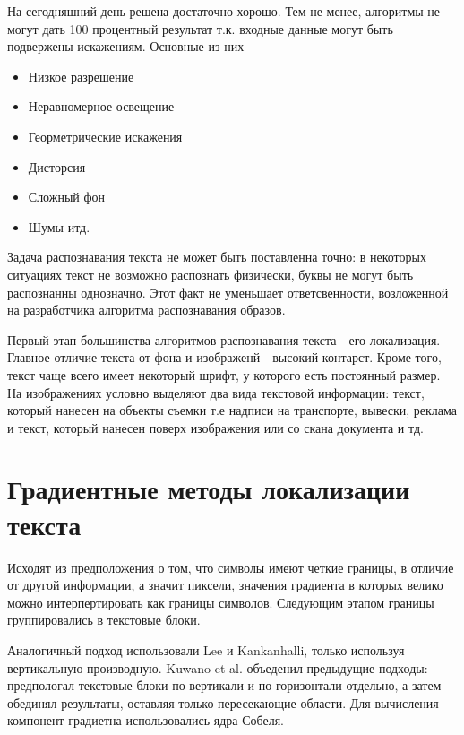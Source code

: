 \documentclass[oneside,final,14pt]{extreport}
\begin{document}
На сегодняшний день решена достаточно хорошо. Тем не менее, алгоритмы не могут дать 100 процентный результат т.к. входные данные могут быть подвержены искажениям. Основные из них

\begin{itemize}[label= $-$, noitemsep]
\item Низкое разрешение 


\item Неравномерное освещение

\item Георметрические искажения

\item Дисторсия

\item Сложный фон

\item Шумы итд.

\end{itemize}

Задача распознавания текста не может быть поставленна точно: в некоторых ситуациях текст не возможно распознать физически, буквы не могут быть распознанны однозначно. Этот факт не уменьшает ответсвенности, возложенной на разработчика алгоритма распознавания образов.

Первый   этап большинства алгоритмов распознавания текста - его локализация. Главное отличие текста от фона и изображенй - высокий контарст. Кроме того, текст чаще всего имеет некоторый шрифт, у которого есть постоянный размер. На изображениях  условно выделяют два вида текстовой информации: текст, который нанесен на объекты съемки т.е надписи на транспорте, вывески, реклама и текст, который нанесен поверх изображения или со скана документа и тд. 

\section{Градиентные методы локализации текста}

Исходят из предположения о том, что символы имеют четкие границы, в отличие от другой информации, а значит пиксели, значения градиента в которых велико можно интерпертировать как границы символов. Следующим этапом границы группировались в текстовые блоки.

Аналогичный подход использовали Lee и Kankanhalli, только используя вертикальную производную. Kuwano et al. объеденил предыдущие подходы: предпологал текстовые блоки по вертикали и по горизонтали отдельно, а затем обединял результаты, оставляя только пересекающие области. Для вычисления компонент градиетна использовались ядра Собеля. 
\end{document}
